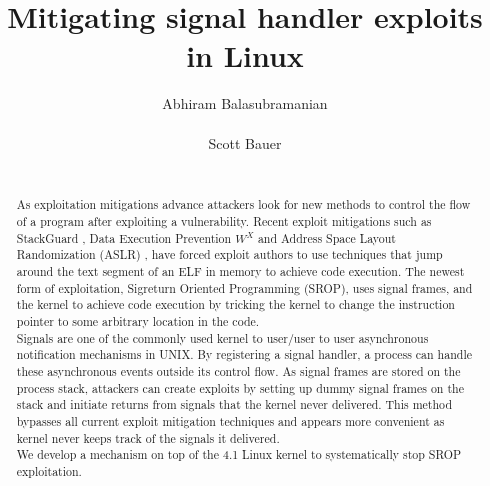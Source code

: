 \documentclass{sig-alternate-05-2015}
\begin{document}
\title{Mitigating signal handler exploits in Linux
}
\author{
\alignauthor
Abhiram Balasubramanian\\
       \\
\alignauthor
Scott Bauer\\
       \\
}

\maketitle
\begin{abstract}
As exploitation mitigations advance attackers look for new methods to control the flow of a program after exploiting a vulnerability. Recent exploit mitigations such as StackGuard \cite{cowan1998stackguard}, Data Execution Prevention \(W^X\) \cite{WXORX} and Address Space Layout Randomization (ASLR) \cite{ASLR}, have forced exploit authors to use techniques that jump around the text segment of an ELF in memory to achieve code execution. The newest form of exploitation, Sigreturn Oriented Programming (SROP), uses signal frames, and the kernel to achieve code execution by tricking the kernel to change the instruction pointer to some arbitrary location in the code.\\
Signals are one of the commonly used kernel to user/user to user asynchronous notification mechanisms in UNIX. By registering a signal handler, a process can handle these asynchronous events outside its control flow. As signal frames are stored on the process stack, attackers can create exploits by setting up dummy signal frames on the stack and initiate returns from signals that the kernel never delivered. This method bypasses all current exploit mitigation techniques and  appears more convenient as kernel never keeps track of the signals it delivered.\\
We develop a mechanism on top of the 4.1 Linux kernel to systematically stop SROP exploitation.

\end{abstract}
\end{document}
